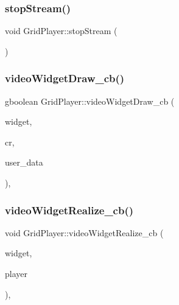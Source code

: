 \mbox{\label{class_grid_player_a85388a3706fef41f2c6145d17f8dfd39}} 
\subsubsection{\texorpdfstring{stop\+Stream()}{stopStream()}}
{\footnotesize\ttfamily void Grid\+Player\+::stop\+Stream (\begin{DoxyParamCaption}{ }\end{DoxyParamCaption})}

\mbox{\label{class_grid_player_ad0dead895ce34fd82123b0770602ea3b}} 
\subsubsection{\texorpdfstring{video\+Widget\+Draw\+\_\+cb()}{videoWidgetDraw\_cb()}}
{\footnotesize\ttfamily gboolean Grid\+Player\+::video\+Widget\+Draw\+\_\+cb (\begin{DoxyParamCaption}\item[{Gtk\+Widget $\ast$}]{widget,  }\item[{cairo\+\_\+t $\ast$}]{cr,  }\item[{gpointer}]{user\+\_\+data }\end{DoxyParamCaption})\hspace{0.3cm}{\ttfamily [static]}, {\ttfamily [private]}}

\mbox{\label{class_grid_player_a74519abbce11aa02f2f97826ca517abb}} 
\subsubsection{\texorpdfstring{video\+Widget\+Realize\+\_\+cb()}{videoWidgetRealize\_cb()}}
{\footnotesize\ttfamily void Grid\+Player\+::video\+Widget\+Realize\+\_\+cb (\begin{DoxyParamCaption}\item[{Gtk\+Widget $\ast$}]{widget,  }\item[{\hyperlink{class_grid_player}{Grid\+Player} $\ast$}]{player }\end{DoxyParamCaption})\hspace{0.3cm}{\ttfamily [static]}, {\ttfamily [private]}}



